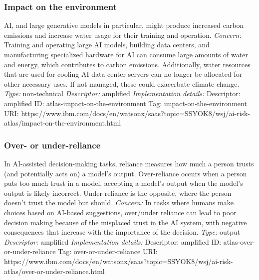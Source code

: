 \documentclass{article}
\begin{document}
\subsubsection*{Impact on the environment}
AI, and large generative models in particular, might produce increased carbon emissions and increase water usage for their training and operation.\newline
\textit{Concern: }Training and operating large AI models, building data centers, and manufacturing specialized hardware for AI can consume large amounts of water and energy, which contributes to carbon emissions. Additionally, water resources that are used for cooling AI data center servers can no longer be allocated for other necessary uses. If not managed, these could exacerbate climate change. \newline\newline
\textit{Type: }non-technical\newline
\textit{Descriptor: }amplified \newline\newline
\textit{Implementation details:} \newline
Descriptor: amplified \newline
ID: atlas-impact-on-the-environment \newline
Tag: impact-on-the-environment \newline
URI:  https://www.ibm.com/docs/en/watsonx/saas?topic=SSYOK8/wsj/ai-risk-atlas/impact-on-the-environment.html\newline
\subsubsection*{Over- or under-reliance}
In AI-assisted decision-making tasks, reliance measures how much a person trusts (and potentially acts on) a model's output. Over-reliance occurs when a person puts too much trust in a model, accepting a model's output when the model's output is likely incorrect. Under-reliance is the opposite, where the person doesn't trust the model but should.\newline
\textit{Concern: }In tasks where humans make choices based on AI-based suggestions, over/under reliance can lead to poor decision making because of the misplaced trust in the AI system, with negative consequences that increase with the importance of the decision.\newline\newline
\textit{Type: }output\newline
\textit{Descriptor: }amplified \newline\newline
\textit{Implementation details:} \newline
Descriptor: amplified \newline
ID: atlas-over-or-under-reliance \newline
Tag: over-or-under-reliance \newline
URI:  https://www.ibm.com/docs/en/watsonx/saas?topic=SSYOK8/wsj/ai-risk-atlas/over-or-under-reliance.html\newline
\end{document}
